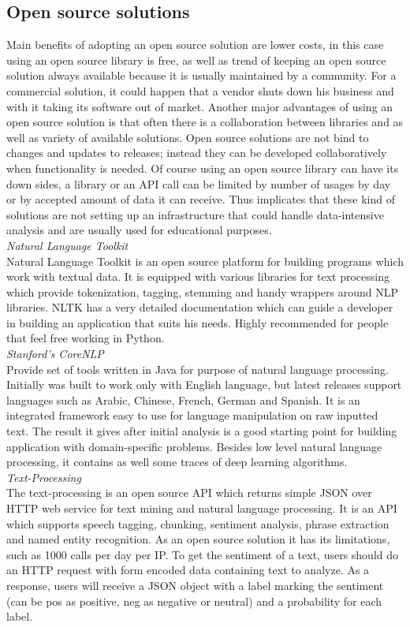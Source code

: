 \subsection*{Open source solutions}
Main benefits of adopting an open source solution are lower costs, in this case using an open source library is free, as well as trend of keeping an open source solution always available because it is usually maintained by a community. For a commercial solution, it could happen that a vendor shuts down his business and with it taking its software out of market. Another major advantages of using an open source solution is that often there is a collaboration between libraries and as well as variety of available solutions. Open source solutions are not bind to changes and updates to releases; instead they can be developed collaboratively when functionality is needed. Of course using an open source library can have its down sides, a library or an API call can be limited by number of usages by day or by accepted amount of data it can receive. Thus implicates that these kind of solutions are not setting up an infrastructure that could handle data-intensive analysis and are usually used for educational purposes.\\
\textit{Natural Language Toolkit\\}
Natural Language Toolkit is an open source platform for building programs which work with textual data. It is equipped with various libraries for text processing which provide tokenization, tagging, stemming and handy wrappers around NLP libraries. NLTK has a very detailed documentation which can guide a developer in building an application that suits his needs. Highly recommended for people that feel free working in Python.\\
\textit{Stanford’s CoreNLP\\}
Provide set of tools written in Java for purpose of natural language processing. Initially was built to work only with English language, but latest releases support languages such as Arabic, Chinese, French, German and Spanish. It is an integrated framework easy to use for language manipulation on raw inputted text. The result it gives after initial analysis is a good starting point for building application with domain-specific problems. Besides low level natural language processing, it contains as well some traces of deep learning algorithms.\\
\textit{Text-Processing\\}
The text-processing is an open source API which returns simple JSON over HTTP web service for text mining and natural language processing. It is an API which supports speech tagging, chunking, sentiment analysis, phrase extraction and named entity recognition. As an open source solution it has its limitations, such as 1000 calls per day per IP. 
To get the sentiment of a text, users should do an HTTP request with form encoded data containing text to analyze. As a response, users will receive a JSON object with a label marking the sentiment (can be pos as positive, neg as negative or neutral) and a probability for each label.



